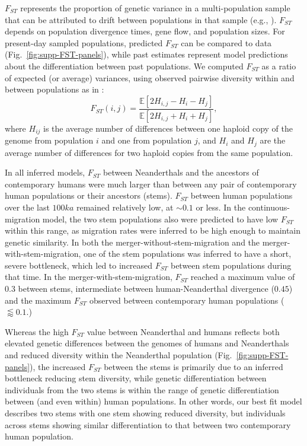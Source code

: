 \documentclass[]{article}
\newcommand{\E}{\mathbb{E}}
\begin{document}
$F_{ST}$ represents the proportion of genetic variance in a multi-population
sample that can be attributed to drift between populations in that sample
(e.g., \cite{Bhatia2013-sq}).  $F_{ST}$ depends on population divergence times,
gene flow, and population sizes. For present-day sampled populations, predicted
$F_{ST}$ can be compared to data (Fig.~\ref{fig:supp-FST-panels}), while past
estimates represent model predictions about the differentiation between past
populations. We computed $F_{ST}$ as a ratio of expected (or average)
variances, using observed pairwise diversity within and between populations as
in \citet{Peter2016-ys}:
\begin{equation}
    F_{ST}(i, j) = \frac{\E[2H_{i,j} - H_i - H_j]}{\E[2H_{i,j} + H_i + H_j]},
    \label{eq:FST}
\end{equation}
where $H_{ij}$ is the average number of differences between one haploid copy of
the genome from population $i$ and one from population $j$, and $H_i$ and $H_j$
are the average number of differences for two haploid copies from the same
population.

In all inferred models, $F_{ST}$ between Neanderthals and the
ancestors of contemporary humans were much larger than between any pair of contemporary
human populations or their ancestors (stems). $F_{ST}$ between human
populations over the last $100ka$ remained relatively low, at $\sim0.1$ or
less. In the continuous-migration model, the two stem populations also were
predicted to have low $F_{ST}$ within this range, as migration rates were
inferred to be high enough to maintain genetic similarity. In both the
merger-without-stem-migration and the merger-with-stem-migration, one of the
stem populations was inferred to have a short, severe bottleneck, which led to
increased $F_{ST}$ between stem populations during that time. In the
merger-with-stem-migration, $F_{ST}$ reached a maximum value of $0.3$ between stems,
intermediate between human-Neanderthal divergence ($0.45$)
and the maximum $F_{ST}$ observed between contemporary human populations
($\lessapprox 0.1$.) 

Whereas the high $F_{ST}$ value between Neanderthal and humans reflects both
elevated genetic differences between the genomes of humans and
Neanderthals and reduced diversity within the Neanderthal population
(Fig.~\ref{fig:supp-FST-panels}), the increased $F_{ST}$ between the stems is
primarily due to an inferred bottleneck reducing stem diversity, while genetic
differentiation between individuals from the two stems is within the range of
genetic differentiation between (and even within) human populations. In other
words, our best fit model describes two stems with one stem showing reduced
diversity, but individuals across stems showing similar differentiation to
that between two contemporary human population.
\end{document}
